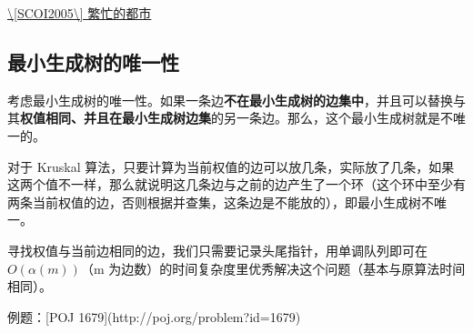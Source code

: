 \href{https://www.lydsy.com/JudgeOnline/problem.php?id=1083}{\textbackslash{}[SCOI2005\textbackslash{}] 繁忙的都市}

\subsection{最小生成树的唯一性}

考虑最小生成树的唯一性。如果一条边\textbf{不在最小生成树的边集中}，并且可以替换与其\textbf{权值相同、并且在最小生成树边集}的另一条边。那么，这个最小生成树就是不唯一的。

对于 Kruskal 算法，只要计算为当前权值的边可以放几条，实际放了几条，如果这两个值不一样，那么就说明这几条边与之前的边产生了一个环（这个环中至少有两条当前权值的边，否则根据并查集，这条边是不能放的），即最小生成树不唯一。

寻找权值与当前边相同的边，我们只需要记录头尾指针，用单调队列即可在$O(\alpha(m))$（m 为边数）的时间复杂度里优秀解决这个问题（基本与原算法时间相同）。

\begin{NOTE}{ 例题：[POJ 1679](http://poj.org/problem?id=1679)}{}

\end{NOTE}


